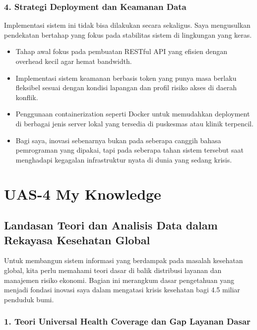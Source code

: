 \documentclass[
  letterpaper,
  DIV=11,
  numbers=noendperiod]{scrreprt}
\begin{document}
\subsection{4. Strategi Deployment dan Keamanan
Data}\label{strategi-deployment-dan-keamanan-data}

Implementasi sistem ini tidak bisa dilakukan secara sekaligus. Saya
mengusulkan pendekatan bertahap yang fokus pada stabilitas sistem di
lingkungan yang keras.

\begin{itemize}
\item
  Tahap awal fokus pada pembuatan RESTful API yang efisien dengan
  overhead kecil agar hemat bandwidth.
\item
  Implementasi sistem keamanan berbasis token yang punya masa berlaku
  fleksibel sesuai dengan kondisi lapangan dan profil risiko akses di
  daerah konflik.
\item
  Penggunaan containerization seperti Docker untuk memudahkan deployment
  di berbagai jenis server lokal yang tersedia di puskesmas atau klinik
  terpencil.
\item
  Bagi saya, inovasi sebenarnya bukan pada seberapa canggih bahasa
  pemrograman yang dipakai, tapi pada seberapa tahan sistem tersebut
  saat menghadapi kegagalan infrastruktur nyata di dunia yang sedang
  krisis.
\end{itemize}


\chapter{UAS-4 My Knowledge}\label{uas-4-my-knowledge}

\section{Landasan Teori dan Analisis Data dalam Rekayasa Kesehatan
Global}\label{landasan-teori-dan-analisis-data-dalam-rekayasa-kesehatan-global}

Untuk membangun sistem informasi yang berdampak pada masalah kesehatan
global, kita perlu memahami teori dasar di balik distribusi layanan dan
manajemen risiko ekonomi. Bagian ini merangkum dasar pengetahuan yang
menjadi fondasi inovasi saya dalam mengatasi krisis kesehatan bagi 4.5
miliar penduduk bumi.

\subsection{1. Teori Universal Health Coverage dan Gap Layanan
Dasar}\label{teori-universal-health-coverage-dan-gap-layanan-dasar}
\end{document}
